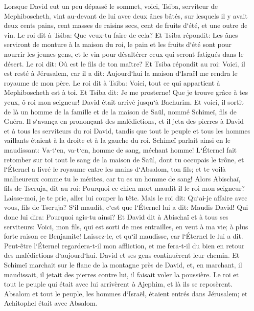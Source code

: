 \verse Lorsque David eut un peu dépassé le sommet, voici, Tsiba, serviteur de Mephiboscheth, vint au-devant de lui avec deux ânes bâtés, sur lesquels il y avait deux cents pains, cent masses de raisins secs, cent de fruits d`été, et une outre de vin. 
\verse Le roi dit à Tsiba: Que veux-tu faire de cela? Et Tsiba répondit: Les ânes serviront de monture à la maison du roi, le pain et les fruits d`été sont pour nourrir les jeunes gens, et le vin pour désaltérer ceux qui seront fatigués dans le désert. 
\verse Le roi dit: Où est le fils de ton maître? Et Tsiba répondit au roi: Voici, il est resté à Jérusalem, car il a dit: Aujourd`hui la maison d`Israël me rendra le royaume de mon père. 
\verse Le roi dit à Tsiba: Voici, tout ce qui appartient à Mephiboscheth est à toi. Et Tsiba dit: Je me prosterne! Que je trouve grâce à tes yeux, ô roi mon seigneur! 
\verse David était arrivé jusqu`à Bachurim. Et voici, il sortit de là un homme de la famille et de la maison de Saül, nommé Schimeï, fils de Guéra. Il s`avança en prononçant des malédictions, 
\verse et il jeta des pierres à David et à tous les serviteurs du roi David, tandis que tout le peuple et tous les hommes vaillants étaient à la droite et à la gauche du roi. 
\verse Schimeï parlait ainsi en le maudissant: Va-t`en, va-t`en, homme de sang, méchant homme! 
\verse L`Éternel fait retomber sur toi tout le sang de la maison de Saül, dont tu occupais le trône, et l`Éternel a livré le royaume entre les mains d`Absalom, ton fils; et te voilà malheureux comme tu le mérites, car tu es un homme de sang! 
\verse Alors Abischaï, fils de Tseruja, dit au roi: Pourquoi ce chien mort maudit-il le roi mon seigneur? Laisse-moi, je te prie, aller lui couper la tête. 
\verse Mais le roi dit: Qu`ai-je affaire avec vous, fils de Tseruja? S`il maudit, c`est que l`Éternel lui a dit: Maudis David! Qui donc lui dira: Pourquoi agis-tu ainsi? 
\verse Et David dit à Abischaï et à tous ses serviteurs: Voici, mon fils, qui est sorti de mes entrailles, en veut à ma vie; à plus forte raison ce Benjamite! Laissez-le, et qu`il maudisse, car l`Éternel le lui a dit. 
\verse Peut-être l`Éternel regardera-t-il mon affliction, et me fera-t-il du bien en retour des malédictions d`aujourd`hui. 
\verse David et ses gens continuèrent leur chemin. Et Schimeï marchait sur le flanc de la montagne près de David, et, en marchant, il maudissait, il jetait des pierres contre lui, il faisait voler la poussière. 
\verse Le roi et tout le peuple qui était avec lui arrivèrent à Ajephim, et là ils se reposèrent. 
\verse Absalom et tout le peuple, les hommes d`Israël, étaient entrés dans Jérusalem; et Achitophel était avec Absalom. 
